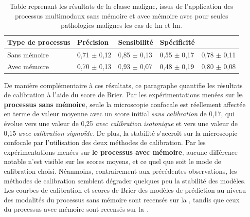 \begin{table}[H]
    \centering
    \begin{tabular}{lllll}
        \toprule 
        Type de processus   & Précision             & Sensibilité           & Spécificité           & \Fscore{}             \\ \midrule
        Sans mémoire        & 0,71 $\pm$ 0,12 	    & 0,85 $\pm$ 0,13 	    & 0,55 $\pm$ 0,17 	    & 0,78 $\pm$ 0,11         \\ \midrule
        Avec mémoire        & 0,70 $\pm$ 0,13 	    & 0,93 $\pm$ 0,07 	    & 0,48 $\pm$ 0,19 	    & 0,80 $\pm$ 0,08         \\ \bottomrule
    \end{tabular}
    \caption{Table reprenant les résultats de la classe maligne, issus de l'application des processus multimodaux sans mémoire et avec mémoire avec pour seules pathologies malignes les cas de \gls{lm} et \gls{lm}.}
    \label{tab:results_multimodal_process_lm}
\end{table}

De manière complémentaire à ces résultats, ce paragraphe quantifie les résultats de calibration à l'aide du score de Brier. Par les expérimentations menées sur \textbf{le processus sans mémoire}, seule la microscopie confocale est réellement affectée en terme de valeur moyenne avec un score initial \textit{sans calibration} de 0,17, qui évolue vers une valeur de 0,25 \textit{avec calibration isotonique} et vers une valeur de 0,15 \textit{avec calibration sigmoïde}. De plus, la stabilité s'accroît sur la microscopie confocale par l'utilisation des deux méthodes de calibration. Par les expérimentations menées sur \textbf{le processus avec mémoire}, aucune différence notable n'est visible sur les scores moyens, et ce quel que soit le mode de calibration choisi. Néanmoins, contrairement aux précédentes observations, les méthodes de calibration semblent dégrader quelques peu la stabilité des modèles. Les courbes de calibration et scores de Brier des modèles de prédiction au niveau des modalités du processus sans mémoire sont recensés sur la , tandis que ceux du processus avec mémoire sont recensés sur la .\par

